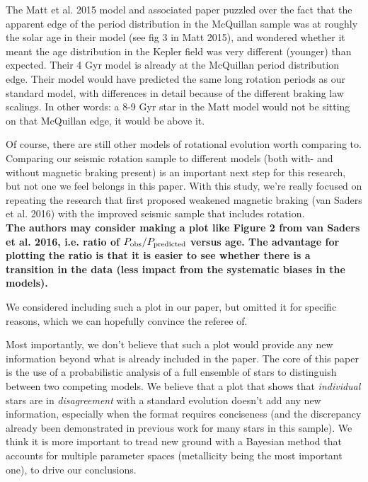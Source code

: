 \documentclass[11pt]{article}
\begin{document}
The Matt et al. 2015 model and associated paper puzzled over the fact that the apparent edge of the period distribution in the McQuillan sample was at roughly the solar age in their model (see fig 3 in Matt 2015), and wondered whether it meant the age distribution in the Kepler field was very different (younger) than expected. Their 4 Gyr model is already at the McQuillan period distribution edge. Their model would have predicted the same long rotation periods as our standard model, with differences in detail because of the different braking law scalings. In other words: a 8-9 Gyr star in the Matt model would not be sitting on that McQuillan edge, it would be above it.

Of course, there are still other models of rotational evolution worth comparing to. Comparing our seismic rotation sample to different models (both with- and without magnetic braking present) is an important next step for this research, but not one we feel belongs in this paper. With this study, we’re really focused on repeating the research that first proposed weakened magnetic braking (van Saders et al. 2016) with the improved seismic sample that includes rotation.\\

\noindent\textbf{The authors may consider making a plot like Figure 2 from van Saders et al. 2016, i.e. ratio of $P_{\rm obs}/P_{\rm predicted}$ versus age. The advantage for plotting the ratio is that it is easier to see whether there is a transition in the data (less impact from the systematic biases in the models).}

We considered including such a plot in our paper, but omitted it for specific reasons, which we can hopefully convince the referee of.

Most importantly, we don’t believe that such a plot would provide any new information beyond what is already included in the paper. The core of this paper is the use of a probabilistic analysis of a full ensemble of stars to distinguish between two competing models. We believe that a plot that shows that \textit{individual} stars are in \textit{disagreement} with a standard evolution doesn’t add any new information, especially when the format requires conciseness (and the discrepancy already been demonstrated in previous work for many stars in this sample). We think it is more important to tread new ground with a Bayesian method that accounts for multiple parameter spaces (metallicity being the most important one), to drive our conclusions.
\end{document}
